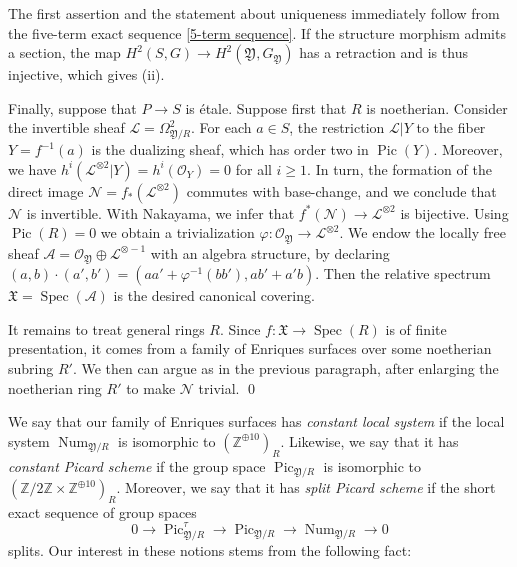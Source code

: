 \documentclass[oneside, 12pt]{amsart}
\newtheorem{proposition}[theorem]{Proposition}
\theoremstyle{definition}
\theoremstyle{remark}
\newcommand{\ZZ}{\mathbb{Z}}
\newcommand{\GG}{\mathbb{G}}
\newcommand{\shA}{\mathscr{A}}
\newcommand{\shN}{\mathscr{N}}
\newcommand{\shL}{\mathscr{L}}
\newcommand{\foX}{\mathfrak{X}}
\newcommand{\foY}{\mathfrak{Y}}
\newcommand{\Br}{\operatorname{Br}}
\newcommand{\lra}{\longrightarrow}
\newcommand{\Num}{\operatorname{Num}}
\renewcommand{\O}{\mathscr{O}}
\newcommand{\Pic}{\operatorname{Pic}}
\newcommand{\quadand}{\quad\text{and}\quad}
\newcommand{\ra}{\rightarrow}
\newcommand{\Spec}{\operatorname{Spec}}
\begin{document}
\proof
The first assertion and the statement about uniqueness immediately follow from
the five-term exact sequence \eqref{5-term sequence}.
If the structure morphism admits a section, the map $H^2(S,G)\ra H^2(\foY,G_\foY)$ has a retraction and is thus injective,
which gives (ii).

Finally, suppose that $P\ra S$ is \'etale. Suppose first that $R$ is noetherian.
Consider the invertible sheaf $\shL=\Omega^2_{\foY/R}$.
For each $a\in S$, the restriction $\shL|Y$ to the fiber $Y=f^{-1}(a)$ is the dualizing sheaf, which has order two
in $\Pic(Y)$. Moreover, we have $h^i(\shL^{\otimes 2}|Y)=h^i(\O_Y)=0$ for all $i\geq 1$. In turn, the formation of the direct image
$\shN=f_*(\shL^{\otimes 2})$ commutes with base-change, and we conclude that $\shN$ is invertible.
With Nakayama, we infer that $f^*(\shN)\ra \shL^{\otimes 2}$ is bijective.
Using $\Pic(R)=0$ we obtain a trivialization $\varphi:\O_\foY\ra\shL^{\otimes 2}$.
We endow the locally free sheaf
$\shA=\O_\foY\oplus\shL^{\otimes -1}$
with an  algebra structure, by declaring $(a,b)\cdot (a',b') = (aa'+\varphi^{-1}(bb'), ab'+a'b)$.
Then the relative spectrum $\foX=\Spec(\shA)$ is the desired canonical covering.

It remains to treat general rings $R$. Since   $f:\foX\ra\Spec(R)$ is of finite presentation, it comes
from a family of Enriques surfaces over some noetherian subring $R'$. We then can argue as in the previous paragraph,
after enlarging the noetherian ring $R'$ to make $\shN$ trivial. 
\qed

\medskip
We say that our family of Enriques surfaces has \emph{constant local system} if 
the local system $\Num_{\foY/R} $ is isomorphic  to  
$(\ZZ^{\oplus 10})_R$. Likewise, we say that it has \emph{constant Picard scheme} if 
the group space $\Pic_{\foY/R}$ is isomorphic to $(\ZZ/2\ZZ\times\ZZ^{\oplus 10})_R$.
Moreover, we say that it has \emph{split Picard scheme} if the short exact sequence of group spaces
\begin{equation}
0\lra \Pic^\tau_{\foY/R}\lra \Pic_{\foY/R}\lra \Num_{\foY/R}\lra 0
\end{equation}
splits. Our interest in these notions stems from the following fact: 
\end{document}

